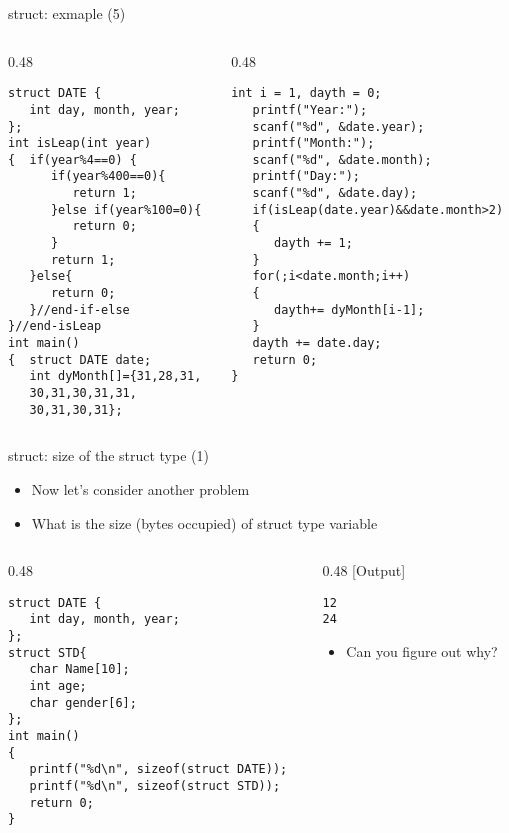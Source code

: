\begin{frame}[fragile]{struct: exmaple (5)}
\vspace{-0.26in}
\begin{columns}
\begin{column}{0.48\linewidth}
\begin{lstlisting}
struct DATE {
   int day, month, year;
};
int isLeap(int year)
{  if(year%4==0) {
      if(year%400==0){
         return 1;
      }else if(year%100=0){
         return 0;
      }
      return 1;
   }else{
      return 0;
   }//end-if-else
}//end-isLeap
int main()
{  struct DATE date;
   int dyMonth[]={31,28,31,
   30,31,30,31,31,
   30,31,30,31};
\end{lstlisting}
\end{column}
\begin{column}{0.48\linewidth}
\begin{lstlisting}[firstnumber=21]
   int i = 1, dayth = 0;
   printf("Year:");
   scanf("%d", &date.year);
   printf("Month:");
   scanf("%d", &date.month);
   printf("Day:");
   scanf("%d", &date.day);
   if(isLeap(date.year)&&date.month>2)
   {
      dayth += 1;
   }
   for(;i<date.month;i++)
   {
      dayth+= dyMonth[i-1];
   }
   dayth += date.day;
   return 0;
}
\end{lstlisting}
\end{column}
\end{columns}
\end{frame}


\begin{frame}[fragile]{struct: size of the struct type (1)}
\begin{itemize}
	\item {Now let's consider another problem}
	\item {What is the size (bytes occupied) of struct type variable}
\end{itemize}
\begin{columns}
\begin{column}{0.48\linewidth}
\begin{lstlisting}
struct DATE {
   int day, month, year;
};
struct STD{
   char Name[10];
   int age;
   char gender[6];
};
int main()
{  
   printf("%d\n", sizeof(struct DATE));
   printf("%d\n", sizeof(struct STD));
   return 0;
}
\end{lstlisting}
\end{column}
\begin{column}{0.48\linewidth}
[Output]
\begin{lstlisting}
12
24
\end{lstlisting}
\begin{itemize}
	\item {Can you figure out why?}
\end{itemize}
\end{column}
\end{columns}
\end{frame}

